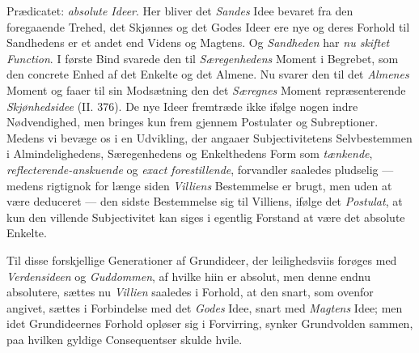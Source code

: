\documentclass[12pt,a4paper]{book}
\newcommand{\opage}[1]{\marginnote{\footnotesize\textit{[#1]}}}
\begin{document}
Prædicatet: \emph{absolute Ideer}. Her bliver det \emph{Sandes} Idee bevaret fra den
foregaaende Trehed, det Skjønnes og det Godes Ideer ere nye og deres Forhold
til Sandhedens er et andet end Videns og Magtens. Og \emph{Sandheden} har \emph{nu skiftet Function}. I
første Bind svarede den til \emph{Særegenhedens} Moment i Begrebet, som den concrete Enhed
af det Enkelte og det Almene. Nu svarer den til det \emph{Almenes} Moment og faaer til sin
Modsætning den det \emph{Særegnes} Moment repræsenterende \emph{Skjønhedsidee} (II. 376).
De nye Ideer fremtræde ikke ifølge nogen indre Nødvendighed, men bringes kun frem gjennem
Postulater og Subreptioner. Medens vi bevæge os i en Udvikling, der angaaer Subjectivitetens
Selvbestemmen i Almindelighedens, Særegenhedens og Enkelthedens Form som \emph{tænkende},
\emph{reflecterende-anskuende} og \emph{exact forestillende}, forvandler saaledes pludselig
--- \opage{156}medens rigtignok for længe siden \emph{Villiens} Bestemmelse er brugt, men uden at være
deduceret --- den sidste Bestemmelse sig til Villiens, ifølge det \emph{Postulat}, at kun den
villende Subjectivitet kan siges i egentlig Forstand at være det absolute Enkelte.

Til disse forskjellige Generationer af Grundideer, der leilighedsviis forøges med
\emph{Verdensideen} og \emph{Guddommen}, af hvilke hiin er absolut, men denne endnu absolutere,
sættes nu \emph{Villien} saaledes i Forhold, at den snart, som ovenfor angivet, sættes i
Forbindelse med det \emph{Godes} Idee, snart med \emph{Magtens} Idee; men idet
Grundideernes Forhold opløser sig i Forvirring, synker Grundvolden sammen, paa hvilken
gyldige Consequentser skulde hvile.
\end{document}
